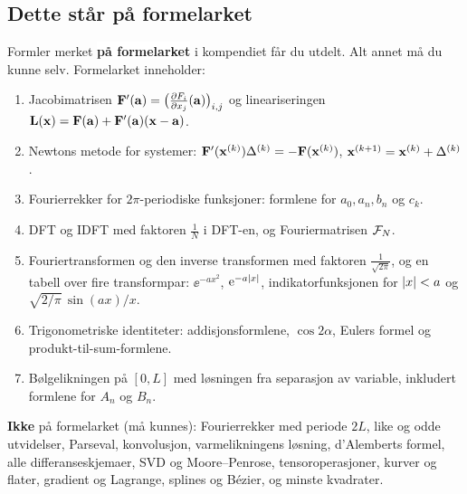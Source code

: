 \subsection{Dette står på formelarket}
Formler merket \colorbox{white}{\sffamily\scriptsize\color{fsfarge}\textbf{på formelarket}} i kompendiet får du utdelt. Alt annet må du kunne selv. Formelarket inneholder:
\begin{enumerate}
  \item Jacobimatrisen $\mathbf{F}'(\mathbf{a})=\bigl(\frac{\partial F_i}{\partial x_j}(\mathbf{a})\bigr)_{i,j}$ og lineariseringen $\mathbf{L}(\mathbf{x})=\mathbf{F}(\mathbf{a})+\mathbf{F}'(\mathbf{a})(\mathbf{x}-\mathbf{a})$.
  \item Newtons metode for systemer: $\mathbf{F}'(\mathbf{x}^{(k)})\Delta^{(k)}=-\mathbf{F}(\mathbf{x}^{(k)})$, $\mathbf{x}^{(k+1)}=\mathbf{x}^{(k)}+\Delta^{(k)}$.
  \item Fourierrekker for $2\pi$-periodiske funksjoner: formlene for $a_0,a_n,b_n$ og $c_k$.
  \item DFT og IDFT med faktoren $\tfrac1N$ i DFT-en, og Fouriermatrisen $\mathcal{F}_N$.
  \item Fouriertransformen og den inverse transformen med faktoren $\tfrac{1}{\sqrt{2\pi}}$, og en tabell over fire transformpar: $\ee^{-ax^2}$, $\mathrm{e}^{-a\lvert x\rvert}$, indikatorfunksjonen for $\lvert x\rvert<a$ og $\sqrt{2/\pi}\,\sin(ax)/x$.
  \item Trigonometriske identiteter: addisjonsformlene, $\cos 2\alpha$, Eulers formel og produkt-til-sum-formlene.
  \item Bølgelikningen på $[0,L]$ med løsningen fra separasjon av variable, inkludert formlene for $A_n$ og $B_n$.
\end{enumerate}
\textbf{Ikke} på formelarket (må kunnes): Fourierrekker med periode $2L$, like og odde utvidelser, Parseval, konvolusjon, varmelikningens løsning, d'Alemberts formel, alle differanseskjemaer, SVD og Moore--Penrose, tensoroperasjoner, kurver og flater, gradient og Lagrange, splines og Bézier, og minste kvadrater.

